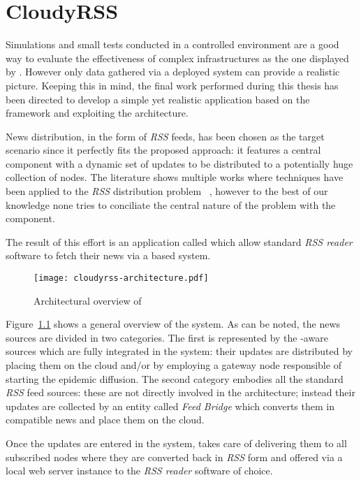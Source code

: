 \chapter{CloudyRSS}
Simulations and small tests conducted in a controlled environment are a
good way to evaluate the effectiveness of complex infrastructures as the
one displayed by \cloudcast. However only data gathered via a
deployed system can provide a realistic picture.
Keeping this in mind, the final work performed during this thesis
has been directed to develop a simple yet realistic application based
on the \cloudypeer framework and exploiting the \cloudcast
architecture.

News distribution, in the form of \textit{RSS} feeds, has been chosen as
the target scenario since it perfectly fits the proposed
approach: it features a central component with a dynamic set of
updates to be distributed to a potentially huge collection of nodes.
The literature shows multiple works where \ptop techniques
have been applied to the \textit{RSS} distribution
problem~\cite{P2PFeedDelivery}
\cite{AttackResilientP2PFeedDissemination}
\cite{SimpleSecurityP2PFeedDissemination}, however to the best of our
knowledge none tries to conciliate the central nature of the problem
with the \ptop component.

The result of this effort is an application called \cloudyrss which
allow standard \textit{RSS reader} software to fetch their news via a
\cloudcast based system.

\begin{figure}[h!]
  \texttt{[image: cloudyrss-architecture.pdf]}
  \caption{Architectural overview of \cloudyrss}
  \label{fig:cloudyrss-architecture}
\end{figure}

Figure~\ref{fig:cloudyrss-architecture} shows a general overview of
the system. As can be noted, the news sources are divided in two
categories. The first is represented by the \cloudyrss-aware sources
which are fully integrated in the system: their updates are distributed
by placing them on the cloud and/or by employing a gateway node
responsible of starting the epidemic diffusion.
The second category embodies all the standard \textit{RSS} feed
sources: these are not directly involved in the architecture; instead their
updates are collected by an entity called \textit{Feed
  Bridge} which converts them in \cloudyrss compatible news and place
them on the cloud.

Once the updates are entered in the system, \cloudcast takes care of
delivering them to all subscribed nodes where they are converted back in
\textit{RSS} form and offered via a local web server instance to the
\textit{RSS reader} software of choice.

